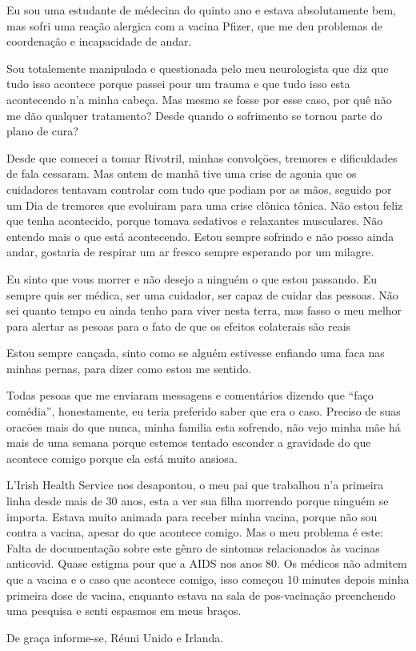 Eu sou uma estudante de médecina do quinto ano e estava absolutamente bem, mas
sofri uma reação alergica com a vacina Pfizer, que me deu problemas de
coordenação e incapacidade de andar.

Sou totalemente manipulada e questionada pelo meu neurologista que diz que tudo
isso acontece porque passei pour um trauma e que tudo isso esta acontecendo n'a
minha cabeça. Mas mesmo se fosse por esse caso, por quê não me dão qualquer
tratamento? Desde quando o sofrimento se tornou parte do plano de cura?

Desde que comecei a tomar Rivotril, minhas convolçōes, tremores e dificuldades
de fala cessaram. Mas ontem de manhã tive uma crise de agonia que os cuidadores
tentavam controlar com tudo que podiam por as mãos, seguido por um Dia de
tremores que evoluiram para uma crise clônica tônica. Não estou feliz que tenha
acontecido, porque tomava sedativos e relaxantes musculares. Não entendo mais o
que está acontecendo. Estou sempre sofrindo e não posso ainda andar, gostaria de
respirar um ar fresco sempre esperando por um milagre.

Eu sinto que vous morrer e não desejo a ninguém o que estou passando. Eu sempre
quis ser médica, ser uma cuidador, ser capaz de cuidar das pessoas. Não sei
quanto tempo eu ainda tenho para viver nesta terra, mas fasso o meu melhor para
alertar as pesoas para o fato de que os efeitos colaterais são reais

Estou sempre cançada, sinto como se alguém estivesse enfiando uma faca nas
minhas pernas, para dizer como estou me sentido.

Todas pesoas que me enviaram messagens e comentários dizendo que “faço comédia”,
honestamente, eu teria preferido saber que era o caso. Preciso de suas oracōes
mais do que nunca, minha familia esta sofrendo, não vejo minha mãe há mais de
uma semana porque estemos tentado esconder a gravidade do que acontece comigo
porque ela está muito ansiosa.

L'Irish Health Service nos desapontou, o meu pai que trabalhou n'a primeira
linha desde mais de 30 anos, esta a ver sua filha morrendo porque ninguém se
importa. Estava muito animada para receber minha vacina, porque não sou contra a
vacina, apesar do que acontece comigo. Mas o meu problema é este: Falta de
documentação sobre este gênro de sintomas relacionados às vacinas
anticovid. Quase estigma pour que a AIDS nos anos 80. Os médicos não admitem que
a vacina e o caso que acontece comigo, isso começou 10 minutes depois minha
primeira dose de vacina, enquanto estava na sala de pos-vacinação preenchendo
uma pesquisa e senti espasmos em meus braços.

De graça informe-se, Réuni Unido e Irlanda.
